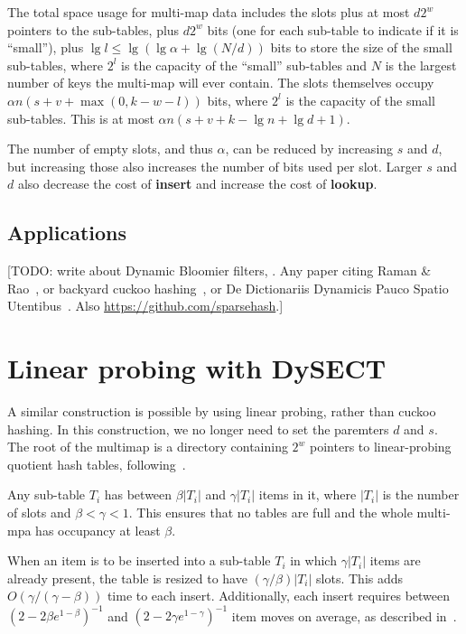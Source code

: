 \documentclass[11pt,letterpaper]{article}
\begin{document}
The total space usage for multi-map data includes the slots plus at most $d 2^w$ pointers to the sub-tables, plus $d 2^w$ bits (one for each sub-table to indicate if it is ``small''), plus $\lg l \leq \lg (\lg \alpha + \lg (N/d))$ bits to store the size of the small sub-tables, where $2^l$ is the capacity of the ``small'' sub-tables and $N$ is the largest number of keys the multi-map will ever contain.
The slots themselves occupy $\alpha n (s + v + \max(0, k - w - l))$ bits, where $2^l$ is the capacity of the small sub-tables.
This is at most $\alpha n (s + v + k - \lg n + \lg d + 1)$.

The number of empty slots, and thus $\alpha$, can be reduced by increasing $s$ and $d$, but increasing those also increases the number of bits used per slot.
Larger $s$ and $d$ also decrease the cost of {\bf insert} and increase the cost of {\bf lookup}.


\subsection{Applications}

[TODO: write about Dynamic Bloomier filters, \cite{DBLP:journals/corr/abs-cs-0502032}. Any paper citing Raman \& Rao~\cite{raman2003succinct}, or backyard cuckoo hashing~\cite{DBLP:journals/corr/abs-0912-5424}, or De Dictionariis Dynamicis Pauco Spatio Utentibus~\cite{DBLP:journals/corr/abs-cs-0512081}. Also \url{https://github.com/sparsehash}.]

\section{Linear probing with DySECT}

A similar construction is possible by using linear probing, rather than cuckoo hashing.
In this construction, we no longer need to set the paremters $d$ and $s$.
The root of the multimap is a directory containing $2^w$ pointers to linear-probing quotient hash tables, following~\cite{pandey2017general}.

Any sub-table $T_i$ has between $\beta |T_i|$ and $\gamma |T_i|$ items in it, where $|T_i|$ is the number of slots and $\beta < \gamma < 1$.
This ensures that no tables are full and the whole multi-mpa has occupancy at least $\beta$.

When an item is to be inserted into a sub-table $T_i$ in which $\gamma |T_i|$ items are already present, the table is resized to have $(\gamma / \beta) |T_i|$ slots.
This adds $O(\gamma / (\gamma - \beta))$ time to each insert.
Additionally, each insert requires between $(2 - 2\beta e^{1-\beta})^{-1}$ and $(2 - 2\gamma e^{1-\gamma})^{-1}$ item moves on average, as described in~\cite{DBLP:journals/corr/abs-1208-0290}.
\end{document}
